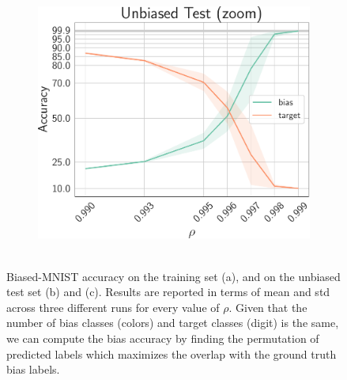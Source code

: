 \begin{figure}
\begin{subfigure}{0.33\textwidth}
        \caption{~}
        \label{fig:mnist-unbiased-test}
    \end{subfigure}
    \hfill
    \begin{subfigure}{0.33\textwidth}
        \centering
        \includegraphics[width=\columnwidth]{img/mnist/unbiased_test_zoom.pdf}
        \caption{~}
        \label{fig:mnist-unbiased-test-zoom}
    \end{subfigure}
    
    \caption{Biased-MNIST accuracy on the training set (a), and on the unbiased test set (b) and (c). Results are reported in terms of mean and std across three different runs for every value of $\rho$. Given that the number of bias classes (colors) and target classes (digit) is the same, we can compute the bias accuracy by finding the permutation of predicted labels which maximizes the overlap with the ground truth bias labels.}
    \label{fig:mnist-training}
\end{figure}

